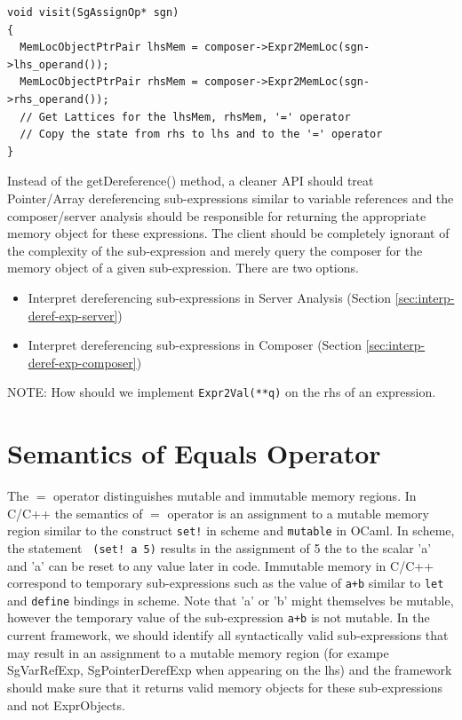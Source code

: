 \documentclass{article}
\begin{document}
\lstset{
label=code:transfer-eq,
caption=Transfer Function for Equals Operator
}
\begin{lstlisting}
void visit(SgAssignOp* sgn)
{
  MemLocObjectPtrPair lhsMem = composer->Expr2MemLoc(sgn->lhs_operand());
  MemLocObjectPtrPair rhsMem = composer->Expr2MemLoc(sgn->rhs_operand());
  // Get Lattices for the lhsMem, rhsMem, '=' operator
  // Copy the state from rhs to lhs and to the '=' operator
}
\end{lstlisting}

\noindent Instead of the getDereference() method, a cleaner API should
treat Pointer/Array dereferencing sub-expressions similar to variable
references and the composer/server analysis should be responsible for
returning the appropriate memory object for these expressions. The client should be completely
ignorant of the complexity of the sub-expression and merely query
the composer for the memory object of a given sub-expression. There are two options.
\begin{itemize}
\item Interpret dereferencing sub-expressions in Server Analysis (Section \ref{sec:interp-deref-exp-server})
\item Interpret dereferencing sub-expressions in Composer (Section \ref{sec:interp-deref-exp-composer})
\end{itemize}

NOTE: How should we implement \texttt{Expr2Val(**q)} on the rhs of an expression.

\section{Semantics of Equals Operator}
The $=$ operator distinguishes mutable and immutable memory regions. In C/C++ the semantics of $=$ operator is an assignment to a mutable memory region similar to the construct
\texttt{set!} in scheme and \texttt{mutable} in OCaml. In scheme, the statement \texttt{ (set! a 5)} results in the assignment of 5
the to the scalar 'a' and 'a' can be reset to any value later in code. Immutable memory  in C/C++ correspond to temporary
sub-expressions such as the value of \texttt{a+b} similar to \texttt{let} and \texttt{define} bindings in scheme. Note that 'a' or 'b' might themselves be mutable, however the temporary value of the sub-expression \texttt{a+b} is not mutable. In the current framework, we should identify all syntactically valid sub-expressions that may result in an assignment to a mutable memory region (for exampe SgVarRefExp, SgPointerDerefExp when appearing on the lhs) and the framework should make sure that it returns valid memory objects for these sub-expressions and not ExprObjects.
\label{sec:sem-of-eq-op}
\end{document}
